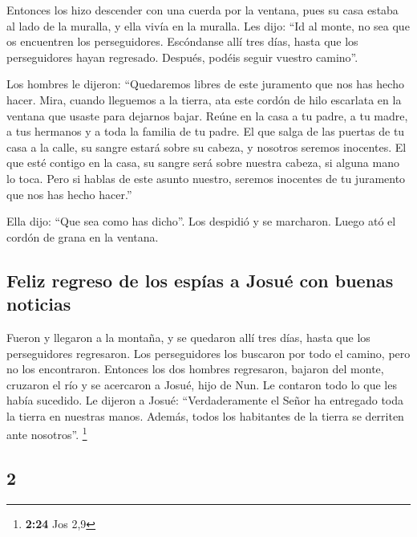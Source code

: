 \begin{paracol}{2}
 Entonces los hizo descender con una cuerda por la
ventana, pues su casa estaba al lado de la muralla, y ella vivía en la
muralla.  Les dijo: ``Id al monte, no sea que os
encuentren los perseguidores. Escóndanse allí tres días, hasta que los
perseguidores hayan regresado. Después, podéis seguir vuestro camino''.

 Los hombres le dijeron: ``Quedaremos libres de este
juramento que nos has hecho hacer.  Mira, cuando
lleguemos a la tierra, ata este cordón de hilo escarlata en la ventana
que usaste para dejarnos bajar. Reúne en la casa a tu padre, a tu madre,
a tus hermanos y a toda la familia de tu padre.  El que
salga de las puertas de tu casa a la calle, su sangre estará sobre su
cabeza, y nosotros seremos inocentes. El que esté contigo en la casa, su
sangre será sobre nuestra cabeza, si alguna mano lo toca.
 Pero si hablas de este asunto nuestro, seremos inocentes
de tu juramento que nos has hecho hacer.''

 Ella dijo: ``Que sea como has dicho''. Los despidió y se
marcharon. Luego ató el cordón de grana en la ventana.

\hypertarget{feliz-regreso-de-los-espuxedas-a-josuuxe9-con-buenas-noticias}{%
\subsection{Feliz regreso de los espías a Josué con buenas
noticias}\label{feliz-regreso-de-los-espuxedas-a-josuuxe9-con-buenas-noticias}}

 Fueron y llegaron a la montaña, y se quedaron allí tres
días, hasta que los perseguidores regresaron. Los perseguidores los
buscaron por todo el camino, pero no los encontraron. 
Entonces los dos hombres regresaron, bajaron del monte, cruzaron el río
y se acercaron a Josué, hijo de Nun. Le contaron todo lo que les había
sucedido.  Le dijeron a Josué: ``Verdaderamente el Señor
ha entregado toda la tierra en nuestras manos. Además, todos los
habitantes de la tierra se derriten ante nosotros''. \footnote{\textbf{2:24}
  Jos 2,9}

\switchcolumn
\begin{otherlanguage}{english}

\hypertarget{section-3}{%
\section{2}\label{section-3}}


\end{otherlanguage}
\end{paracol}
